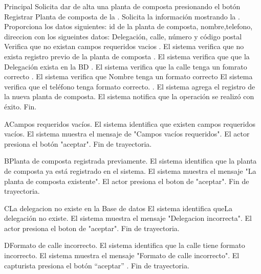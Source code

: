 \begin{UCtrayectoria}{Principal}
	\UCpaso[\UCactor] Solicita dar de alta una planta de composta presionando el botón Registrar
	Planta de composta de la .
	\UCpaso Solicita la información mostrando la .
	\UCpaso[\UCactor] Proporciona los datos siguientes: id de la planta de composta, nombre,telefono, direccion con los sigueintes datos: Delegación, calle, número y código postal
	\UCpaso Verifica que no existan campos requeridos vacios .
	\UCpaso El sistema verifica que no exista registro previo de la planta de composta .
	\UCpaso El sistema verifica que que la Delegación exista en la BD .
	\UCpaso El sistema verifica que la calle tenga un fomrato correcto .
	\UCpaso El sistema verifica que Nombre tenga un formato correcto 
	\UCpaso El sistema verifica que el teléfono tenga formato correcto. .
	\UCpaso El sistema agrega el registro de la nueva planta de composta.
	\UCpaso El sistema notifica que la operación se realizó con éxito.
	\UCpaso Fin.
	
	
\end{UCtrayectoria}
	
\begin{UCtrayectoriaA}{A}{Campos requeridos vacíos.}
	\UCpaso El sistema identifica que existen campos requeridos vacíos.
	\UCpaso El sistema muestra el mensaje de "Campos vacíos requeridos".
	\UCpaso El actor presiona el botón "aceptar".
	\UCpaso Fin de trayectoria.
\end{UCtrayectoriaA}

\begin{UCtrayectoriaA}{B}{Planta de composta registrada previamente.}
	\UCpaso El sistema identifica que la planta de composta ya está registrado en el sistema.
	\UCpaso El sistema muestra el mensaje "La planta de composta existente".
	\UCpaso El actor presiona el boton de "aceptar".
	\UCpaso Fin de trayectoria.
\end{UCtrayectoriaA}

\begin{UCtrayectoriaA}{C}{La delegacion no existe en la Base de datos}
	\UCpaso El sistema identifica queLa delegación no existe.
	\UCpaso El sistema muestra el mensaje "Delegacion incorrecta".
	\UCpaso El actor presiona el boton de "aceptar".
	\UCpaso Fin de trayectoria.
\end{UCtrayectoriaA}

\begin{UCtrayectoriaA}{D}{Formato de calle incorrecto.}
	\UCpaso El sistema identifica que la calle tiene formato incorrecto.
	\UCpaso El sistema muestra el mensaje "Formato de calle incorrecto".
	\UCpaso El capturista presiona el botón “aceptar”
	\UCpaso. Fin de trayectoria.
\end{UCtrayectoriaA}

